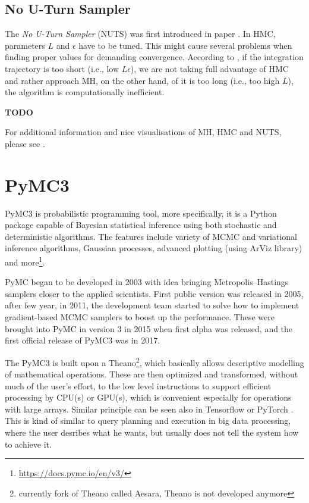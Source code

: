 \documentclass[
  digital, %
  oneside, %
  lof,     %
  lot,     %
]{fithesis4}
\begin{document}
\subsection{No U-Turn Sampler}
\label{sec:nuts}

The \textit{No U-Turn Sampler} (NUTS) was first introduced in 
paper \cite{hoffman2011}. In HMC, parameters $L$ and $\epsilon$ 
have to be tuned. This might cause several problems when 
finding proper values for demanding convergence.
According to \cite{betancourt2018}, if the integration 
trajectory is too short (i.e., low $L\epsilon$),
we are not taking full advantage of HMC and rather
approach MH, on the other hand, of it is too long (i.e., too high $L$),
the algorithm is computationally inefficient.

\textbf{TODO}

For additional information and nice visualisations of 
MH, HMC and NUTS, please see \cite{mcelreath2017}.

\section{PyMC3}

PyMC3 is probabilistic programming tool, more specifically, 
it is a Python package capable of Bayesian statistical 
inference using both stochastic and deterministic algorithms. 
The features include variety of MCMC and variational inference algorithms,
Gaussian processes, advanced plotting
(using ArViz library) and more\footnote{\url{https://docs.pymc.io/en/v3/}}.

PyMC began to be developed in 2003 with idea
bringing Metropolis–Hastings samplers closer to 
the applied scientists.
First public version was released in 2005,
after few year, in 2011, the development team
started to solve how to implement gradient-based MCMC samplers
to boost up the performance.
These were brought into PyMC in version 3
in 2015 when first alpha was released, and
the first official release of PyMC3 was in 2017.

The PyMC3 is built upon a Theano\footnote{currently fork of 
Theano called Aesara, Theano is not developed anymore},
which basically allows descriptive modelling 
of mathematical operations.
These are then optimized and transformed,
without much of the user's effort, to 
the low level instructions to support efficient 
processing by CPU(s) or GPU(s), which is convenient 
especially for operations with large arrays.
Similar principle can be seen also in Tensorflow 
\cite{tf} or PyTorch \cite{pytorch}.
This is kind of similar to query planning and execution
in big data processing, where the user desribes what
he wants, but usually does not tell the system how 
to achieve it.
\end{document}
